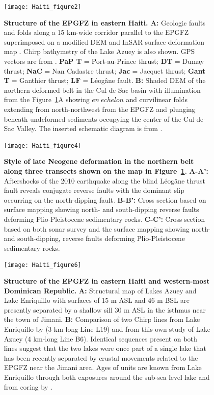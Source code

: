 \documentclass[linenumbers,draft]{agujournal}
\begin{document}
\begin{figure}
\centering
\texttt{[image: Haiti\_figure2]}
\caption{\textbf{Structure of the EPGFZ in eastern Haiti. A:} Geologic faults and folds along a 15 km-wide corridor parallel to the EPGFZ superimposed on a modified DEM and InSAR surface deformation map \citep{hayes2010complex,hashimoto2011fan}. Chirp bathymetry of the Lake Azuey is also shown. GPS vectors are from \citet{calais2010transpressional}. \textbf{PaP T} = Port-au-Prince thrust; \textbf{DT} = Dumay thrust; \textbf{NaC} = Nan Cadastre thrust; \textbf{Jac} = Jacquet thrust; \textbf{Gant T} = Ganthier thrust; \textbf{LF} = L\'eog\^ane fault. \textbf{B:} Shaded DEM of the northern deformed belt in the Cul-de-Sac basin with illumination from the Figure~\ref{figure2}A showing $en~echelon$ and curvilinear folds extending from north-northwest from the EPGFZ and plunging beneath undeformed sediments occupying the center of the Cul-de-Sac Valley. The inserted schematic diagram is from \citet{odonne1983analogue}.}
\label{figure2}
\end{figure}

\begin{figure}
\centering
\texttt{[image: Haiti\_figure4]}
\caption{\textbf{Style of late Neogene deformation in the northern belt along three transects shown on the map in Figure~\ref{figure2}.} \textbf{A-A':} Aftershocks of the 2010 earthquake along the blind L\'eog\^ane thrust fault reveals conjugate reverse faults with the dominant slip occurring on the north-dipping fault. \textbf{B-B':} Cross section based on surface mapping showing north- and south-dipping reverse faults deforming Plio-Pleistocene sedimentary rocks. \textbf{C-C':} Cross section based on both sonar survey and the surface mapping showing north- and south-dipping, reverse faults deforming Plio-Pleistocene sedimentary rocks.}
\label{figure3}
\end{figure}

\begin{figure}
\centering
\texttt{[image: Haiti\_figure6]}
\caption{\textbf{Structure of the EPGFZ in eastern Haiti and western-most Dominican Republic.} \textbf{A:} Structural map of Lakes Azuey and Lake Enriquillo with surfaces of 15 m ASL and 46 m BSL are presently separated by a shallow sill 30 m ASL in the isthmus near the town of Jimani. \textbf{B:} Comparison of two Chirp lines from Lake Enriquillo by \citet{rios2013holocene} (3 km-long Line L19) and from this own study of Lake Azuey (4 km-long Line B6). Identical sequences present on both lines suggest that the two lakes were once part of a single lake that has been recently separated by crustal movements related to the EPGFZ near the Jimani area. Ages of units are known from Lake Enriquillo through both exposures around the sub-sea level lake and from coring by \citet{rios2013holocene}.}
\label{figure4}
\end{figure}
\end{document}
